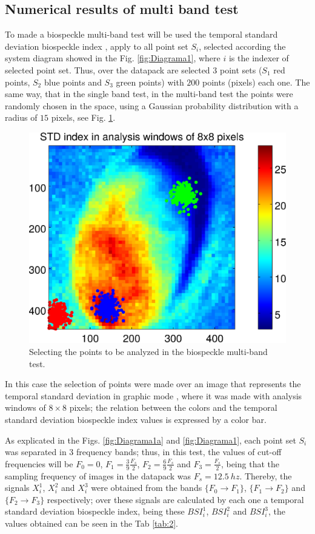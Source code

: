\documentclass[review]{elsarticle}
\begin{document}
\subsection{Numerical results of multi band test} 
\label{subsec:numericalmulti}
To made a biospeckle multi-band test will be used the temporal standard deviation biospeckle 
index \cite{Nothdurft:05}, apply to all point set  $S_i$, selected 
according the system diagram showed in the Fig. \ref{fig:Diagrama1}, where $i$ is the indexer
of selected point set. Thus,
over the datapack are selected 3 point sets ($S_1$ red points, $S_2$ blue points and $S_3$ green points) with 
$200$ points (pixels) each one. The same way, that in the single band test, in the multi-band test
the points were randomly chosen in the space, using a Gaussian probability distribution 
with a radius of $15$ pixels, see Fig. \ref{fig:select_points_std}.
\begin{figure}[ht!]
\centering
\includegraphics[width=0.5\columnwidth]{select_points_std.eps}
\caption{Selecting the points to be analyzed in the biospeckle multi-band test.}
\label{fig:select_points_std}
\end{figure}
In this case the selection of points were made over an image that represents 
the temporal standard deviation in graphic mode \cite{BSLTLBOOK,Nothdurft:05},
where it was made with analysis windows of $8 \times 8$ pixels;
the relation between the colors and the temporal standard deviation biospeckle 
index values is expressed by a color bar.

As explicated in the Figs. \ref{fig:Diagrama1a} and \ref{fig:Diagrama1}, each point set $S_i$ was separated
in $3$ frequency bands; thus, in this test, the values of cut-off frequencies will be
$F_0=0$, $F_1=\frac{3}{9}\frac{F_s}{2}$, $F_2=\frac{6}{9}\frac{F_s}{2}$ and $F_3=\frac{F_s}{2}$, being that
the sampling frequency of images in the datapack was $F_s=12.5~hz$. Thereby, 
the signals $X^1_i$, $X^2_i$ and $X^3_i$ were obtained from the bands $\{F_0 \rightarrow F_1\}$,
$\{F_1 \rightarrow F_2\}$ and $\{F_2 \rightarrow F_3\}$ respectively; over these signals 
are calculated by each one a temporal standard deviation biospeckle index, being these
$BSI^1_i$, $BSI^2_i$ and $BSI^3_i$, the values obtained can be seen in the Tab \ref{tab:2}.
\end{document}
